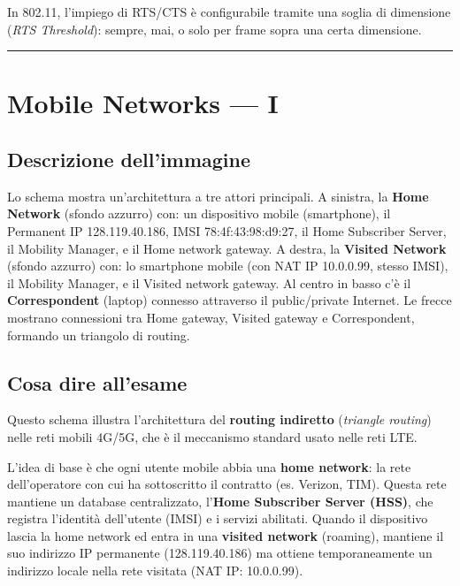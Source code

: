 \documentclass[
  italian,
  openany]{book}
\begin{document}
In 802.11, l'impiego di RTS/CTS è configurabile tramite una soglia di
dimensione (\emph{RTS Threshold}): sempre, mai, o solo per frame sopra
una certa dimensione.

\begin{center}\rule{0.5\linewidth}{0.5pt}\end{center}

\section{Mobile Networks --- I}\label{mobile-networks-i}

\subsection{Descrizione dell'immagine}\label{descrizione-dellimmagine-3}

Lo schema mostra un'architettura a tre attori principali. A sinistra, la
\textbf{Home Network} (sfondo azzurro) con: un dispositivo mobile
(smartphone), il Permanent IP 128.119.40.186, IMSI 78:4f:43:98:d9:27, il
Home Subscriber Server, il Mobility Manager, e il Home network gateway.
A destra, la \textbf{Visited Network} (sfondo azzurro) con: lo
smartphone mobile (con NAT IP 10.0.0.99, stesso IMSI), il Mobility
Manager, e il Visited network gateway. Al centro in basso c'è il
\textbf{Correspondent} (laptop) connesso attraverso il public/private
Internet. Le frecce mostrano connessioni tra Home gateway, Visited
gateway e Correspondent, formando un triangolo di routing.

\subsection{Cosa dire all'esame}\label{cosa-dire-allesame-3}

Questo schema illustra l'architettura del \textbf{routing indiretto}
(\emph{triangle routing}) nelle reti mobili 4G/5G, che è il meccanismo
standard usato nelle reti LTE.

L'idea di base è che ogni utente mobile abbia una \textbf{home network}:
la rete dell'operatore con cui ha sottoscritto il contratto (es.
Verizon, TIM). Questa rete mantiene un database centralizzato,
l'\textbf{Home Subscriber Server (HSS)}, che registra l'identità
dell'utente (IMSI) e i servizi abilitati. Quando il dispositivo lascia
la home network ed entra in una \textbf{visited network} (roaming),
mantiene il suo indirizzo IP permanente (128.119.40.186) ma ottiene
temporaneamente un indirizzo locale nella rete visitata (NAT IP:
10.0.0.99).
\end{document}
